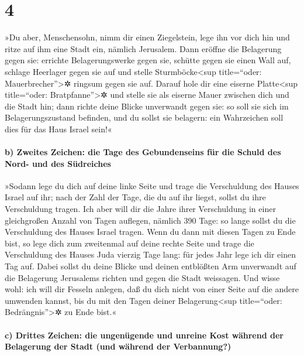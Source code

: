 \hypertarget{section-3}{%
\section{4}\label{section-3}}

»Du aber, Menschensohn, nimm dir einen Ziegelstein, lege
ihn vor dich hin und ritze auf ihm eine Stadt ein, nämlich Jerusalem.
Dann eröffne die Belagerung gegen sie: errichte
Belagerungswerke gegen sie, schütte gegen sie einen Wall auf, schlage
Heerlager gegen sie auf und stelle Sturmböcke\textless sup title=``oder:
Mauerbrecher''\textgreater✲ ringsum gegen sie auf. Darauf
hole dir eine eiserne Platte\textless sup title=``oder:
Bratpfanne''\textgreater✲ und stelle sie als eiserne Mauer zwischen dich
und die Stadt hin; dann richte deine Blicke unverwandt gegen sie: so
soll sie sich im Belagerungszustand befinden, und du sollst sie
belagern: ein Wahrzeichen soll dies für das Haus Israel sein!«

\hypertarget{b-zweites-zeichen-die-tage-des-gebundenseins-fuxfcr-die-schuld-des-nord--und-des-suxfcdreiches}{%
\paragraph{b) Zweites Zeichen: die Tage des Gebundenseins für die Schuld
des Nord- und des
Südreiches}\label{b-zweites-zeichen-die-tage-des-gebundenseins-fuxfcr-die-schuld-des-nord--und-des-suxfcdreiches}}

»Sodann lege du dich auf deine linke Seite und trage die
Verschuldung des Hauses Israel auf ihr; nach der Zahl der Tage, die du
auf ihr liegst, sollst du ihre Verschuldung tragen. Ich
aber will dir die Jahre ihrer Verschuldung in einer gleichgroßen Anzahl
von Tagen auflegen, nämlich 390 Tage: so lange sollst du die
Verschuldung des Hauses Israel tragen. Wenn du dann mit
diesen Tagen zu Ende bist, so lege dich zum zweitenmal auf deine rechte
Seite und trage die Verschuldung des Hauses Juda vierzig Tage lang: für
jedes Jahr lege ich dir einen Tag auf. Dabei sollst du
deine Blicke und deinen entblößten Arm unverwandt auf die Belagerung
Jerusalems richten und gegen die Stadt weissagen. Und
wisse wohl: ich will dir Fesseln anlegen, daß du dich nicht von einer
Seite auf die andere umwenden kannst, bis du mit den Tagen deiner
Belagerung\textless sup title=``oder: Bedrängnis''\textgreater✲ zu Ende
bist.«

\hypertarget{c-drittes-zeichen-die-ungenuxfcgende-und-unreine-kost-wuxe4hrend-der-belagerung-der-stadt-und-wuxe4hrend-der-verbannung}{%
\paragraph{c) Drittes Zeichen: die ungenügende und unreine Kost während
der Belagerung der Stadt (und während der
Verbannung?)}\label{c-drittes-zeichen-die-ungenuxfcgende-und-unreine-kost-wuxe4hrend-der-belagerung-der-stadt-und-wuxe4hrend-der-verbannung}}

